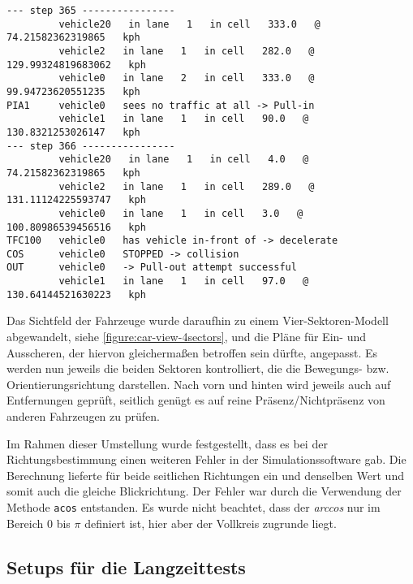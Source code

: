 \vspace{1em}
\footnotesize\begin{verbatim}
--- step 365 ----------------
         vehicle20   in lane   1   in cell   333.0   @   74.21582362319865   kph
         vehicle2   in lane   1   in cell   282.0   @   129.99324819683062   kph
         vehicle0   in lane   2   in cell   333.0   @   99.94723620551235   kph
PIA1     vehicle0   sees no traffic at all -> Pull-in
         vehicle1   in lane   1   in cell   90.0   @   130.8321253026147   kph
--- step 366 ----------------
         vehicle20   in lane   1   in cell   4.0   @   74.21582362319865   kph
         vehicle2   in lane   1   in cell   289.0   @   131.11124225593747   kph
         vehicle0   in lane   1   in cell   3.0   @   100.80986539456516   kph
TFC100   vehicle0   has vehicle in-front of -> decelerate
COS      vehicle0   STOPPED -> collision
OUT      vehicle0   -> Pull-out attempt successful
         vehicle1   in lane   1   in cell   97.0   @   130.64144521630223   kph
\end{verbatim}
\normalsize
\vspace{1em}

Das Sichtfeld der Fahrzeuge wurde daraufhin zu einem Vier-Sektoren-Modell abgewandelt, siehe \cref{figure:car-view-4sectors}, und die Pläne für Ein- und Ausscheren, der hiervon gleichermaßen betroffen sein dürfte, angepasst.
Es werden nun jeweils die beiden Sektoren kontrolliert, die die Bewegungs- bzw. Orientierungsrichtung darstellen. 
Nach vorn und hinten wird jeweils auch auf Entfernungen geprüft, seitlich genügt es auf reine Präsenz/Nichtpräsenz von anderen Fahrzeugen zu prüfen.

Im Rahmen dieser Umstellung wurde festgestellt, dass es bei der Richtungsbestimmung einen weiteren Fehler in der Simulationssoftware gab.
Die Berechnung lieferte für beide seitlichen Richtungen ein und denselben Wert und somit auch die gleiche Blickrichtung.
Der Fehler war durch die Verwendung der Methode \texttt{acos} entstanden. Es wurde nicht beachtet, dass der \textit{arccos} nur im Bereich 0 bis $ \pi $ definiert ist, hier aber der Vollkreis zugrunde liegt.






\subsection{Setups für die Langzeittests}
\label{sec:setup-dauertests}


